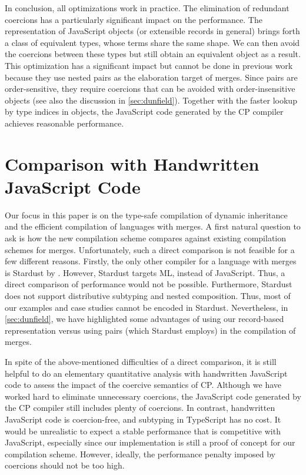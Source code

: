 In conclusion, all optimizations work in practice. The elimination of redundant
coercions has a particularly significant impact on the performance. The
representation of JavaScript objects (or extensible records in general) brings
forth a class of equivalent types, whose terms share the same shape. We can then
avoid the coercions between these types but still obtain an equivalent object as
a result. This optimization has a significant impact but cannot be done in
previous work~\citep{dunfield2014elaborating,oliveira2016disjoint} because they
use nested pairs as the elaboration target of merges. Since pairs are
order-sensitive, they require coercions that can be avoided with
order-insensitive objects (see also the discussion in \autoref{sec:dunfield}).
Together with the faster lookup by type indices in objects, the JavaScript code
generated by the CP compiler achieves reasonable performance.

\section{Comparison with Handwritten JavaScript Code}

Our focus in this paper is on the type-safe compilation of dynamic inheritance
and the efficient compilation of languages with merges. A first natural question
to ask is how the new compilation scheme compares against existing compilation
schemes for merges. Unfortunately, such a direct comparison is not feasible for
a few different reasons. Firstly, the only other compiler for a language with
merges is Stardust by \citet{dunfield2014elaborating}. However, Stardust targets
ML, instead of JavaScript. Thus, a direct comparison of performance would not be
possible. Furthermore, Stardust does not support distributive subtyping and
nested composition. Thus, most of our examples and case studies cannot be
encoded in Stardust. Nevertheless, in \autoref{sec:dunfield}, we have
highlighted some advantages of using our record-based representation versus
using pairs (which Stardust employs) in the compilation of merges.  

In spite of the above-mentioned difficulties of a direct comparison, it is still
helpful to do an elementary quantitative analysis with handwritten JavaScript
code to assess the impact of the coercive semantics of CP. Although we have
worked hard to eliminate unnecessary coercions, the JavaScript code generated by
the CP compiler still includes plenty of coercions. In contrast, handwritten
JavaScript code is coercion-free, and subtyping in TypeScript has no cost. It
would be unrealistic to expect a stable performance that is competitive with
JavaScript, especially since our implementation is still a proof of concept for
our compilation scheme. However, ideally, the performance penalty imposed by
coercions should not be too high.

